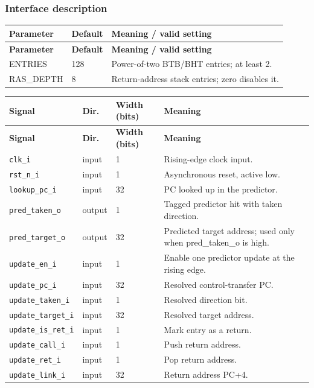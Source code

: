 \documentclass[11pt]{article}
\begin{document}
\subsubsection{Interface description}
{\small
\begin{longtable}{@{}L{0.2500\dimexpr\linewidth-24pt\relax}L{0.2300\dimexpr\linewidth-24pt\relax}L{0.5200\dimexpr\linewidth-24pt\relax}@{}}
\toprule
\textbf{Parameter} & \textbf{Default} & \textbf{Meaning / valid setting} \\ \midrule
\endfirsthead
\toprule
\textbf{Parameter} & \textbf{Default} & \textbf{Meaning / valid setting} \\ \midrule
\endhead
ENTRIES & 128 & Power-of-two BTB/BHT entries; at least 2. \\ \addlinespace[3pt]
RAS\_DEPTH & 8 & Return-address stack entries; zero disables it. \\*
\bottomrule\end{longtable}}
{\small
\begin{longtable}{@{}L{0.3400\dimexpr\linewidth-36pt\relax}L{0.1000\dimexpr\linewidth-36pt\relax}L{0.1000\dimexpr\linewidth-36pt\relax}L{0.4600\dimexpr\linewidth-36pt\relax}@{}}
\toprule
\textbf{Signal} & \textbf{Dir.} & \textbf{Width (bits)} & \textbf{Meaning} \\ \midrule
\endfirsthead
\toprule
\textbf{Signal} & \textbf{Dir.} & \textbf{Width (bits)} & \textbf{Meaning} \\ \midrule
\endhead
\texttt{clk\_i} & input & 1 & Rising-edge clock input. \\ \addlinespace[3pt]
\texttt{rst\_n\_i} & input & 1 & Asynchronous reset, active low. \\ \addlinespace[3pt]
\texttt{lookup\_pc\_i} & input & 32 & PC looked up in the predictor. \\ \addlinespace[3pt]
\texttt{pred\_taken\_o} & output & 1 & Tagged predictor hit with taken direction. \\ \addlinespace[3pt]
\texttt{pred\_target\_o} & output & 32 & Predicted target address; used only when pred\_taken\_o is high. \\ \addlinespace[3pt]
\texttt{update\_en\_i} & input & 1 & Enable one predictor update at the rising edge. \\ \addlinespace[3pt]
\texttt{update\_pc\_i} & input & 32 & Resolved control-transfer PC. \\ \addlinespace[3pt]
\texttt{update\_taken\_i} & input & 1 & Resolved direction bit. \\ \addlinespace[3pt]
\texttt{update\_target\_i} & input & 32 & Resolved target address. \\ \addlinespace[3pt]
\texttt{update\_is\_ret\_i} & input & 1 & Mark entry as a return. \\ \addlinespace[3pt]
\texttt{update\_call\_i} & input & 1 & Push return address. \\ \addlinespace[3pt]
\texttt{update\_ret\_i} & input & 1 & Pop return address. \\ \addlinespace[3pt]
\texttt{update\_link\_i} & input & 32 & Return address PC+4. \\*
\bottomrule\end{longtable}}
\end{document}
